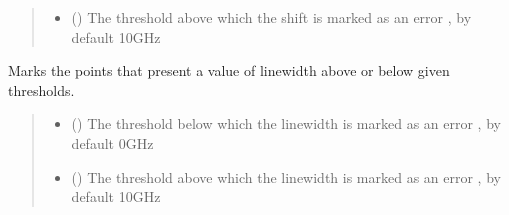 \documentclass[letterpaper,10pt,english]{sphinxmanual}
\begin{document}
\begin{fulllineitems}
\begin{fulllineitems}
\begin{quote}
\begin{description}
\begin{itemize}
\item {} 
\sphinxAtStartPar
{} (\sphinxstyleliteralemphasis{\sphinxupquote{, }}) \textendash{} The threshold above which the shift is marked as an error , by default 10GHz

\end{itemize}

\end{description}\end{quote}

\end{fulllineitems}


\begin{fulllineitems}
\label{\detokenize{source/_autosummary/HDF5_BLS_treat.Treat:HDF5_BLS_treat.Treat.mark_errors_linewidth}}
\pysigstartsignatures
\pysiglinewithargsret
{}
{\sphinxparamcomma {}}
{}
\pysigstopsignatures
\sphinxAtStartPar
Marks the points that present a value of linewidth above or below given thresholds.
\begin{quote}\begin{description}
\begin{itemize}
\item {} 
\sphinxAtStartPar
{} (\sphinxstyleliteralemphasis{\sphinxupquote{, }}) \textendash{} The threshold below which the linewidth is marked as an error , by default 0GHz

\item {} 
\sphinxAtStartPar
{} (\sphinxstyleliteralemphasis{\sphinxupquote{, }}) \textendash{} The threshold above which the linewidth is marked as an error , by default 10GHz


\end{itemize}
\end{description}
\end{quote}
\end{fulllineitems}
\end{fulllineitems}
\end{document}
